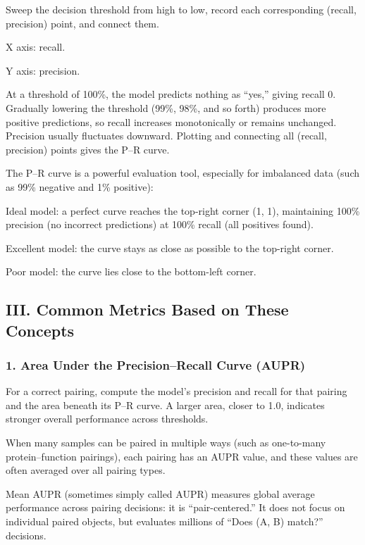 Sweep the decision threshold from high to low, record each corresponding (recall, precision) point, and connect them.

X axis: recall.

Y axis: precision.

At a threshold of 100\%, the model predicts nothing as ``yes,'' giving recall 0. Gradually lowering the threshold (99\%, 98\%, and so forth) produces more positive predictions, so recall increases monotonically or remains unchanged. Precision usually fluctuates downward. Plotting and connecting all (recall, precision) points gives the P--R curve.

The P--R curve is a powerful evaluation tool, especially for imbalanced data (such as 99\% negative and 1\% positive):

Ideal model: a perfect curve reaches the top-right corner (1, 1), maintaining 100\% precision (no incorrect predictions) at 100\% recall (all positives found).

Excellent model: the curve stays as close as possible to the top-right corner.

Poor model: the curve lies close to the bottom-left corner.

\hypertarget{iii.-common-metrics-based-on-these-concepts}{%
\subsection{III. Common Metrics Based on These Concepts}\label{iii.-common-metrics-based-on-these-concepts}}

\hypertarget{area-under-the-precisionrecall-curve-aupr}{%
\subsubsection{1. Area Under the Precision--Recall Curve (AUPR)}\label{area-under-the-precisionrecall-curve-aupr}}

For a correct pairing, compute the model's precision and recall for that pairing and the area beneath its P--R curve. A larger area, closer to 1.0, indicates stronger overall performance across thresholds.

When many samples can be paired in multiple ways (such as one-to-many protein--function pairings), each pairing has an AUPR value, and these values are often averaged over all pairing types.

Mean AUPR (sometimes simply called AUPR) measures global average performance across pairing decisions: it is ``pair-centered.'' It does not focus on individual paired objects, but evaluates millions of ``Does (A, B) match?'' decisions.

